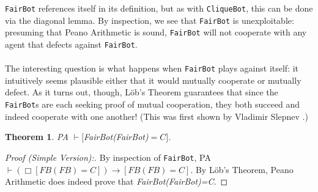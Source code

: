 \documentclass[12pt, letterpaper]{article}
\newtheorem{theorem}{Theorem}[section]
\numberwithin{equation}{section}
\begin{document}
\texttt{FairBot} references itself in its definition, but as with \texttt{CliqueBot}, this can be done via the diagonal lemma. By inspection, we see that \texttt{FairBot} is unexploitable: presuming that Peano Arithmetic is sound, \texttt{FairBot} will not cooperate with any agent that defects against \texttt{FairBot}.
\\
\\ The interesting question is what happens when \texttt{FairBot} plays against itself: it intuitively seems plausible either that it would mutually cooperate or mutually defect. As it turns out, though, L\"{o}b's Theorem guarantees that since the \texttt{FairBot}s are each seeking proof of mutual cooperation, they both succeed and indeed cooperate with one another! (This was first shown by Vladimir Slepnev \cite{Slepnev}.)
\begin{theorem} \label{FBFB}
\emph{\textsf{PA}} $\vdash [$FairBot(FairBot)$=C]$.
\end{theorem}
\begin{proof}[Proof (Simple Version):]
By inspection of \texttt{FairBot}, \textsf{PA}$\vdash(\Box[FB(FB)=C])\to [FB(FB)=C]$. By L\"{o}b's Theorem, Peano Arithmetic does indeed prove that \emph{FairBot(FairBot)=C}.
\end{proof}
\end{document}
